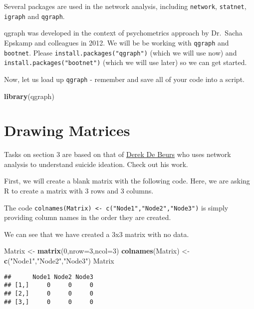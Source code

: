\documentclass[]{book}
\newenvironment{Shaded}{\begin{snugshade}}{\end{snugshade}}
\newcommand{\DataTypeTok}[1]{\textcolor[rgb]{0.13,0.29,0.53}{#1}}
\newcommand{\DecValTok}[1]{\textcolor[rgb]{0.00,0.00,0.81}{#1}}
\newcommand{\KeywordTok}[1]{\textcolor[rgb]{0.13,0.29,0.53}{\textbf{#1}}}
\newcommand{\NormalTok}[1]{#1}
\newcommand{\StringTok}[1]{\textcolor[rgb]{0.31,0.60,0.02}{#1}}
\begin{document}
Several packages are used in the network analysis, including \texttt{network}, \texttt{statnet}, \texttt{igraph} and \texttt{qgraph}.

qgraph was developed in the context of psychometrics approach by Dr.~Sacha Epskamp and colleagues in 2012. We will be be working with \texttt{qgraph} and \texttt{bootnet}. Please \texttt{install.packages("qgraph")} (which we will use now) and \texttt{install.packages("bootnet")} (which we will use later) so we can get started.

Now, let us load up \texttt{qgraph} - remember and save all of your code into a script.

\begin{Shaded}
\begin{Highlighting}[]
\KeywordTok{library}\NormalTok{(qgraph)}
\end{Highlighting}
\end{Shaded}

\hypertarget{drawing-matrices}{%
\section{Drawing Matrices}\label{drawing-matrices}}

Tasks on section 3 are based on that of \href{http://www.derekdebeurs.com/about}{Derek De Beurs} who uses network analysis to understand suicide ideation. Check out his work.

First, we will create a blank matrix with the following code. Here, we are asking R to create a matrix with 3 rows and 3 columns.

The code \texttt{colnames(Matrix)\ \textless{}-\ c("Node1","Node2","Node3")} is simply providing column names in the order they are created.

We can see that we have created a 3x3 matrix with no data.

\begin{Shaded}
\begin{Highlighting}[]
\NormalTok{Matrix <-}\StringTok{ }\KeywordTok{matrix}\NormalTok{(}\DecValTok{0}\NormalTok{,}\DataTypeTok{nrow=}\DecValTok{3}\NormalTok{,}\DataTypeTok{ncol=}\DecValTok{3}\NormalTok{)}
\KeywordTok{colnames}\NormalTok{(Matrix) <-}\StringTok{ }\KeywordTok{c}\NormalTok{(}\StringTok{"Node1"}\NormalTok{,}\StringTok{"Node2"}\NormalTok{,}\StringTok{"Node3"}\NormalTok{)}
\NormalTok{Matrix}
\end{Highlighting}
\end{Shaded}

\begin{verbatim}
##      Node1 Node2 Node3
## [1,]     0     0     0
## [2,]     0     0     0
## [3,]     0     0     0
\end{verbatim}
\end{document}
